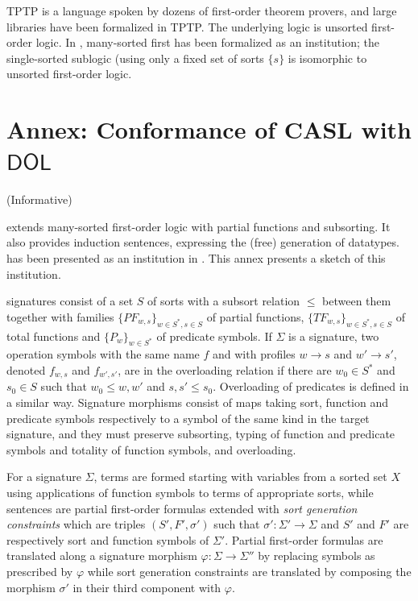 \documentclass[10pt,fleqn,final]{scrreprt}
\newcommand{\cbs}[0]{\color{red}\xspace} %
\newcommand{\cbe}[0]{\color{black}\xspace} %
\newcommand*{\DOL}{\ensuremath{\mathsf{DOL}}\xspace}
\newcommand{\informative}[0]{{\begin{center}{\Large{(Informative})}\end{center}} \bigskip}
\newcommand{\infannex}[1]{ \chapter{Annex: #1}  \informative }
\newenvironment{definitions}[0]{\medskip }{}
\begin{document}
\begin{definitions}
TPTP \cite{TPTP,DBLP:conf/cade/SutcliffeSY94,DBLP:journals/jar/Sutcliffe09}
is a language spoken by dozens of first-order theorem provers,
and large libraries have been formalized in TPTP.
The underlying logic is unsorted first-order logic. In 
\cite{GoguenBurstall92}, many-sorted first has been formalized as
an institution; the single-sorted sublogic (using only a fixed
set of sorts $\{s\}$ is isomorphic to unsorted first-order logic.

\infannex{Conformance of CASL with \DOL}\label{a:casl}


\CASL \cite{CASL-RM} extends many-sorted first-order logic with
partial functions and subsorting.  It also provides induction
sentences, expressing the (free) generation of datatypes.  \CASL has
been presented as an institution in \cite{Mossakowski02,CASL-RM}.\cbs This annex presents
a sketch of this institution.\cbe

\CASL signatures consist of a set $S$ of sorts with a subsort relation $\leq$ between them
together with
families $\{PF_{w,s}\}_{w\in S^*, s\in S}$ of partial functions,
$\{TF_{w,s}\}_{w\in S^*, s\in S}$ of total functions and
$\{P_w\}_{w\in S^*}$ of predicate symbols. 
If $\Sigma$ is a signature, 
two operation symbols with the same name $f$ and with profiles
$w\rightarrow s$ and $w'\rightarrow s'$, denoted $f_{w,s}$ and $f_{w',s'}$, are in the
overloading relation if there are $w_0\in S^*$ and $s_0\in S$ such
that $w_0\leq w, w'$ and $s,s' \leq s_0$. Overloading of predicates is defined in a similar way.
Signature morphisms consist of maps taking sort, function and predicate symbols
respectively to a symbol of the same kind in the target signature, and they 
must preserve subsorting, typing of function and predicate symbols and totality of function symbols,
 and overloading. 

For a signature $\Sigma$, terms are formed starting with
variables from a sorted set $X$ using 
applications of function symbols to terms of appropriate sorts, while
sentences are partial first-order formulas extended with
\emph{sort generation constraints} which are triples $(S', F', \sigma')$ such that 
$\sigma':\Sigma'\rightarrow\Sigma$ and $S'$ and $F'$ are respectively sort and function symbols of
$\Sigma'$. 
Partial first-order formulas are translated along a signature morphism 
$\varphi:\Sigma\rightarrow\Sigma''$ by replacing symbols as prescribed by $\varphi$
while sort generation constraints are translated by
composing the morphism $\sigma'$ in their third component with $\varphi$.


\end{definitions}
\end{document}
